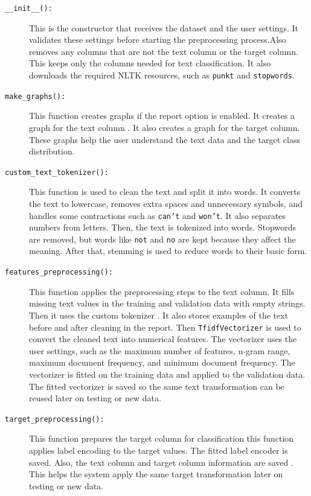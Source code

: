 \documentclass[12pt,a4paper]{report}
\begin{document}
\begin{description}
    \item[\texttt{\_\_init\_\_():}]
     This is the constructor that receives the dataset and the user settings. 
     It validates these settings before starting the preprocessing process.Also removes any columns that are not the text column or the target
     column. This keeps only the columns needed for text classification. It also
    downloads the required NLTK resources, such as \texttt{punkt} and
    \texttt{stopwords}.
    \item[\texttt{make\_graphs():}]
    This function creates graphs if the report option is enabled. It creates a graph for
    the text column . It also creates a graph for the target column. These graphs help the user understand the text data and the target class distribution.

    \item[\texttt{custom\_text\_tokenizer():}]
    This function is used to clean the text and split it into words. It converts the text to
    lowercase, removes extra spaces and unnecessary symbols, and handles some contractions
    such as \texttt{can't} and \texttt{won't}. It also separates numbers from letters.
    Then, the text is tokenized into words. Stopwords are removed, but words like
    \texttt{not} and \texttt{no} are kept because they affect the meaning. After that,
    stemming is used to reduce words to their basic form.

\item[\texttt{features\_preprocessing():}]
This function applies the preprocessing steps to the text column. It fills
missing text values in the training and validation data with empty strings. 
Then it uses the custom tokenizer . It also stores examples of the text
before and after cleaning in the report. Then \texttt{TfidfVectorizer} is used to convert the cleaned text into numerical
features. The vectorizer uses the user settings, such as the maximum number of
features, n-gram range, maximum document frequency, and minimum document frequency.
The vectorizer is fitted on the training data and applied to the validation
data. The fitted vectorizer is saved so the same
text transformation can be reused later on testing or new data.

\item[\texttt{target\_preprocessing():}]
This function prepares the target column for classification this function  applies label
encoding to the target values. The fitted label encoder is saved. Also, the text
column and target column information are saved . This helps the
system apply the same target transformation later on testing or new data.


\end{description}
\end{document}
